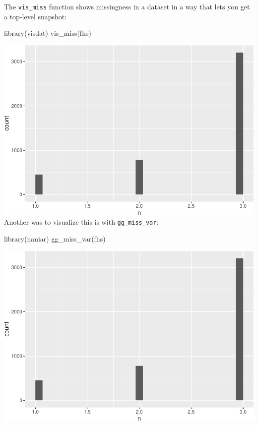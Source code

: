 \documentclass[
]{book}
\newenvironment{Shaded}{\begin{snugshade}}{\end{snugshade}}
\newcommand{\FunctionTok}[1]{\textcolor[rgb]{0.00,0.00,0.00}{#1}}
\newcommand{\NormalTok}[1]{#1}
\begin{document}
The \texttt{vis\_miss} function shows missingness in a dataset in a way that lets you
get a top-level snapshot:

\begin{Shaded}
\begin{Highlighting}[]
\FunctionTok{library}\NormalTok{(visdat)}
\FunctionTok{vis\_miss}\NormalTok{(fhs)}
\end{Highlighting}
\end{Shaded}

\includegraphics{adv_epi_analysis_files/figure-latex/unnamed-chunk-71-1.pdf}
Another was to visualize this is with \texttt{gg\_miss\_var}:

\begin{Shaded}
\begin{Highlighting}[]
\FunctionTok{library}\NormalTok{(naniar)}
\FunctionTok{gg\_miss\_var}\NormalTok{(fhs)}
\end{Highlighting}
\end{Shaded}

\includegraphics{adv_epi_analysis_files/figure-latex/unnamed-chunk-72-1.pdf}
\end{document}
